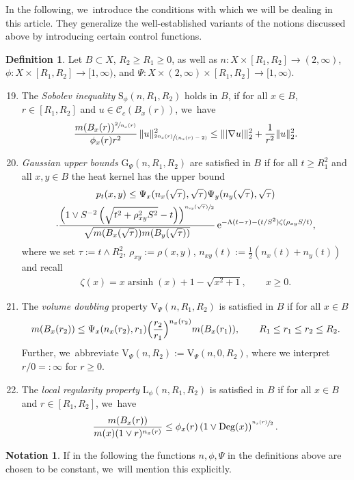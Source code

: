 \documentclass[10pt]{amsart}
\newenvironment{enumerateA}
{\bgroup\def\theenumi{\Alph{enumi}}\def\theenumii{\arabic{enumii}}\begin{enumerate}}
{\end{enumerate}\egroup}
\newcommand{\spfrac}[2]{\sfrac{#1}{(#2)}}
\newcommand{\rG}{\mathrm{G}}
\newcommand{\rS}{\mathrm{S}}
\newcommand{\rV}{\mathrm{V}}
\newcommand{\rL}{\mathrm{L}}
\theoremstyle{plain}
\theoremstyle{definition}
\newtheorem{definition}[theorem]{Definition}
\newtheorem*{notation}{Notation}
\newcommand{\cC}{\mathcal{C}}
\newcommand{\euler}{\mathrm{e}}
\DeclareMathOperator{\Deg}{Deg}
\DeclareMathOperator{\arsinh}{arsinh}
\begin{document}
In the following, we~introduce the conditions with which we will be dealing in this article. They generalize the well-established variants of {the notions discussed above} by introducing certain control functions.
\begin{definition}\label{def:sobvol} Let $B\subset X$, $R_2\geq R_1\geq 0$, as well as $n\colon X\times [R_1,R_2]\to (2,\infty)$, $\phi\colon X\times [R_1,R_2]\to [1,\infty)$, and ${\Psi}\colon X\times {(2,\infty)}\times [R_1,R_2]\to [1,\infty)$.
\begin{enumerateA}
\setcounter{enumi}{18}
\item\label{S}
The {\em Sobolev inequality} $\rS_\phi(n,R_1,R_2)$ holds in $B$, if for all $x\in B$, $r\in[R_1,R_2]$ {and $u\in\cC_{c}(B_x(r))$}, we~have
\begin{equation*}
\frac{m(B_x(r))^{\sfrac{2}{n_x(r)}}}{\phi_x(r)r^2}\,
\Vert u\Vert_{\spfrac{2n_x(r)}{n_x(r)-2}}^2
\leq \Vert \vert\nabla u\vert\Vert_2^2+\frac{1}{r^2}\Vert u\Vert_2^2.
\end{equation*}

\setcounter{enumi}{6}
\item\label{G} \emph{Gaussian upper bounds} $\rG_\Psi(n,R_1,R_2)$ are satisfied in $ B $ if for all $t\geq R_1^2$ and all $x,y\in B$ the heat kernel has the upper bound
\begin{multline*}
p_{t}(x,y)
\leq {\Psi_x(n_x(\sqrt \tau),\sqrt \tau)\Psi_y(n_y(\sqrt \tau),\sqrt \tau)}
\\
\cdot
\frac{\left(1\vee S^{-2}\left(\sqrt{t^2+\rho_{xy}^2S^2}-t\right)\right)^{\sfrac{n_{xy}(\sqrt \tau)}{2}}}
{\sqrt{m(B_{x}(\sqrt \tau))m(B_{y}(\sqrt \tau))}}\,
\euler^{-\Lambda (t-\tau)-(t/S^2)\zeta\left(\rho_{xy}S/t\right)},
\end{multline*}
where we set {$\tau:=t\wedge R_2^2$}, $ \rho_{xy}:=\rho(x,y) $, $ n_{xy}(t):=\frac12({n_x(t)+n_y(t)}) $
and recall
\begin{align*}
\zeta(x)=x\arsinh(x)+1-\sqrt{x^2+1}, \qquad x\geq 0.
\end{align*}

\setcounter{enumi}{21}
\item\label{V} The \emph{volume doubling} property $\rV_{{\Psi}}(n, R_1,R_2)$ is satisfied in $B$ if for all $x\in B$
\[
m(B_x(r_2))\leq {\Psi_x(n_x(r_2),r_1)}\Bigl(\frac{r_2}{r_1}\Bigr)^{n_x(r_2)} m(B_x(r_1)),\qquad R_1\leq r_1\leq r_2\leq R_2.
\]
Further, we~abbreviate $\rV_{{\Psi}}(n,R_2):=\mathrm{V}_{{\Psi}}(n,0,R_2)$, where we interpret $r/0=:\infty$ for $r\geq 0$.

\setcounter{enumi}{11}
\item\label{L}
The \emph{local regularity property} $\rL_\phi(n,R_1,R_2)$ is satisfied in $ B $ if for all $x\in B$ and $r\in[R_1,R_2]$, we~have
\[
\frac{m(B_x(r))}{m(x)(1\vee r)^{n_x(r)}}
\leq \phi_x(r)\left(1\vee\Deg(x)\right)^{\sfrac{n_x(r)}2}.
\]
\end{enumerateA}
\end{definition}
\begin{notation}
If {in the following} the functions $n,\phi,\Psi$ in the definitions above are chosen to be constant, we~will mention this explicitly.
\end{notation}
\end{document}
